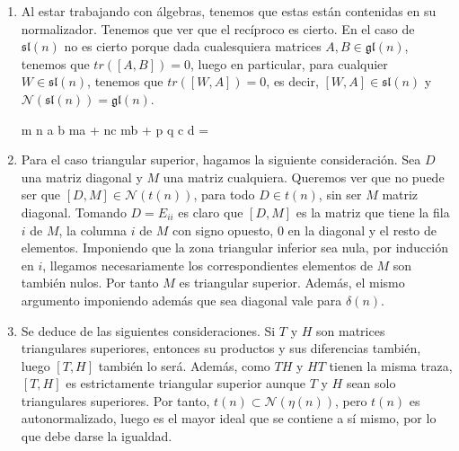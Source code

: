\documentclass[twoside]{article}
\begin{document}
\begin{solucion}
\begin{enumerate}
\item Al estar trabajando con álgebras, tenemos que estas están contenidas en su normalizador. Tenemos que ver que el recíproco es cierto. En el caso de $\mathfrak{sl}(n)$ no es cierto porque dada cualesquiera matrices $A,B\in\mathfrak{gl}(n)$, tenemos que $tr([A,B])=0$, luego en particular, para cualquier $W\in \mathfrak{sl}(n)$, tenemos que $tr([W,A])=0$, es decir, $[W,A]\in\mathfrak{sl}(n)$ y $\mathcal{N}(\mathfrak{sl}(n))=\mathfrak{gl}(n)$. %

m n a b     ma + nc  mb + 
p q c d   =
\item 
Para el caso triangular superior, hagamos la siguiente consideración. Sea $D$ una matriz diagonal y $M$ una matriz cualquiera. Queremos ver que no puede ser que $[D,M] \in \mathcal{N}(t(n))$, para todo $D\in t(n)$, sin ser $M$ matriz diagonal. Tomando $D=E_{ii}$ es claro que $[D,M]$ es la matriz que tiene la fila $i$ de $M$, la columna $i$ de $M$ con signo opuesto, $0$ en la diagonal y el resto de elementos. Imponiendo que la zona triangular inferior sea nula, por inducción en $i$, llegamos  necesariamente los correspondientes elementos de $M$ son también nulos. Por tanto $M$ es triangular superior. Además, el mismo argumento imponiendo además que sea diagonal vale para $\delta(n)$.

\item Se deduce de las siguientes consideraciones. Si $T$ y $H$ son matrices triangulares superiores, entonces su productos y sus diferencias también, luego $[T,H]$ también lo será. Además, como $TH$ y $HT$ tienen la misma traza, $[T,H]$ es estrictamente triangular superior aunque $T$ y $H$ sean solo triangulares superiores. Por tanto, $t(n) \subset \mathcal{N}(\eta(n))$, pero $t(n)$ es autonormalizado, luego es el mayor ideal que se contiene a sí mismo, por lo que debe darse la igualdad. 
\end{enumerate}
\end{solucion}
\end{document}
